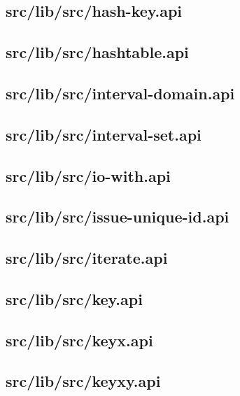 \subsection{src/lib/src/hash-key.api}


\subsection{src/lib/src/hashtable.api}


\subsection{src/lib/src/interval-domain.api}


\subsection{src/lib/src/interval-set.api}


\subsection{src/lib/src/io-with.api}


\subsection{src/lib/src/issue-unique-id.api}


\subsection{src/lib/src/iterate.api}


\subsection{src/lib/src/key.api}


\subsection{src/lib/src/keyx.api}


\subsection{src/lib/src/keyxy.api}


